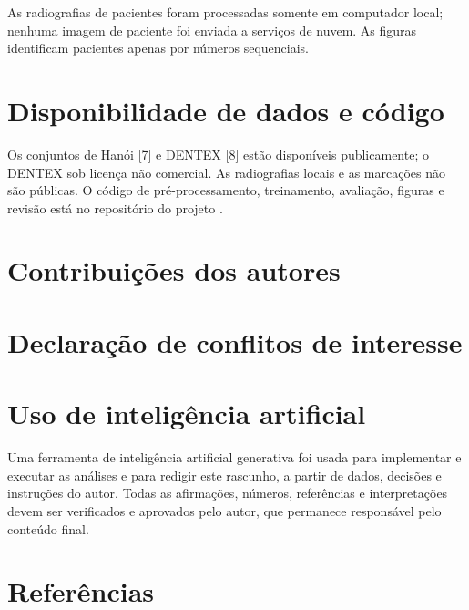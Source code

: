 \documentclass[twocolumn]{article}
\begin{document}
 As radiografias de pacientes foram processadas somente em computador local; nenhuma imagem de paciente foi enviada a serviços de nuvem. As figuras identificam pacientes apenas por números sequenciais.

\section*{Disponibilidade de dados e código}

Os conjuntos de Hanói [7] e DENTEX [8] estão disponíveis publicamente; o DENTEX sob licença não comercial. As radiografias locais e as marcações não são públicas.  O código de pré-processamento, treinamento, avaliação, figuras e revisão está no repositório do projeto .

\section*{Contribuições dos autores}


\section*{Declaração de conflitos de interesse}


\section*{Uso de inteligência artificial}

Uma ferramenta de inteligência artificial generativa foi usada para implementar e executar as análises e para redigir este rascunho, a partir de dados, decisões e instruções do autor. Todas as afirmações, números, referências e interpretações devem ser verificados e aprovados pelo autor, que permanece responsável pelo conteúdo final.

\balance
\section*{Referências}
\end{document}
